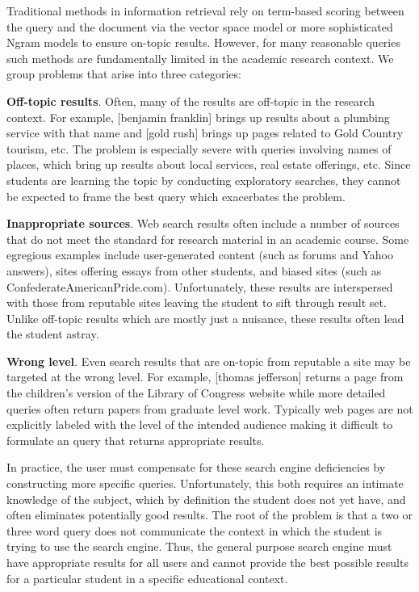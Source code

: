 \documentclass[pdfpagelabels=false,plainpages=true]{acm_proc_article-sp}
\begin{document}
Traditional methods in information retrieval rely on term-based scoring between
the query and the document via the vector space model \cite{salton1975vector} or
more sophisticated Ngram models to ensure on-topic results. However, for many
reasonable queries such methods are fundamentally limited in the academic
research context. We group problems that arise into three categories:

{\bf Off-topic results}. Often, many of the results are off-topic in the
research context. For example, [benjamin franklin] brings up results about a
plumbing service with that name and [gold rush] brings up pages related to Gold
Country tourism, etc. The problem is especially severe with queries involving
names of places, which bring up results about local services, real estate
offerings, etc. Since students are learning the topic by conducting exploratory
searches, they cannot be expected to frame the best query which exacerbates the problem.

{\bf Inappropriate sources}. Web search results often include a number of sources
that do not meet the standard for research material in an academic course. Some
egregious examples include user-generated content (such as forums and Yahoo answers), 
sites offering essays from other students, and biased sites (such as
ConfederateAmericanPride.com). Unfortunately, these results are interspersed
with those from reputable sites leaving the student to sift through result
set. Unlike off-topic results which are mostly just a nuisance, these results
often lead the student astray.   

{\bf Wrong level}. Even search results that are on-topic from reputable
a site may be targeted at the wrong level. For example, [thomas jefferson]
returns a page from the children's version of the Library of Congress
website while  more detailed queries often return papers from graduate level
work. Typically web pages are not explicitly labeled with the level of
the intended audience making it difficult to formulate an query that returns
appropriate results.

In practice, the user must compensate for these search engine deficiencies by
constructing more specific queries. Unfortunately, this both requires an
intimate knowledge of the subject, which by definition the student does not yet
have, and often eliminates potentially good results. The root of the problem is
that a two or three word query does not communicate the context in which the
student is trying to use the search engine. Thus, the general purpose
search engine must have appropriate results for all users and cannot
provide the best possible results for a particular student in a specific
educational context. 
\end{document}
